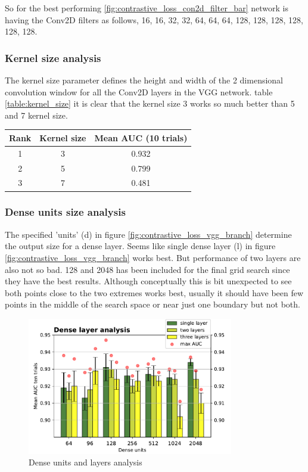 So for the best performing \ref{fig:contrastive_loss_con2d_filter_bar} network is having the Conv2D filters as follows, 16, 16, 32, 32, 64, 64, 64, 128, 128, 128, 128, 128, 128.  

\subsubsection{Kernel size analysis}
The kernel size parameter defines the height and width of the 2 dimensional convolution window for all the Conv2D layers in the VGG network. table \ref{table:kernel_size} it is clear that the kernel size 3 
works so much better than 5 and 7 kernel size. 

\begin{center}
    \begin{tabular}{||c c c||} 
      \hline\hline
      Rank & Kernel size & Mean AUC (10 trials) \\[0.5ex] 
      \hline
      1 & 3 &  0.932\\      
      \hline
      2 & 5 &  0.799\\      
      \hline
      3 & 7 &  0.481\\      
      \hline
    \end{tabular}
  \label{table:kernel_size}
\end{center}

\subsubsection{Dense units size analysis} 
The specified 'units' (d) in figure \ref{fig:contrastive_loss_vgg_branch} determine the output size for a dense layer. Seems like single dense layer (l) in figure \ref{fig:contrastive_loss_vgg_branch} works best. But performance 
of two layers are also not so bad.
128 and 2048 has been included for the final grid search since they have the best results. Although conceptually this is bit unexpected to see both points close to the two extremes works best, usually it should have been few points 
in the middle of the search space or near just one boundary but not both. %

\begin{figure}[ht]
\centering
\includegraphics[height= 6cm]{images/contrastive/contrastive_loss_dense_bar}
\caption{Dense units and layers analysis}
\label{fig:contrastive_loss_dense_bar}
\end{figure}

